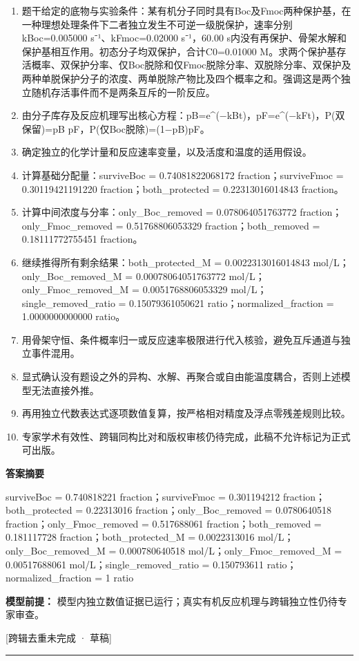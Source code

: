 \documentclass[UTF8,11pt,a4paper]{ctexart}
\begin{document}
\begin{enumerate}
\item 题干给定的底物与实验条件：某有机分子同时具有Boc及Fmoc两种保护基，在一种理想处理条件下二者独立发生不可逆一级脱保护，速率分别kBoc=0.005000 s⁻¹、kFmoc=0.02000 s⁻¹，60.00 s内没有再保护、骨架水解和保护基相互作用。初态分子均双保护，合计C0=0.01000 M。求两个保护基存活概率、双保护分率、仅Boc脱除和仅Fmoc脱除分率、双脱除分率、双保护及两种单脱保护分子的浓度、两单脱除产物比及四个概率之和。强调这是两个独立随机存活事件而不是两条互斥的一阶反应。
\item 由分子库存及反应机理写出核心方程：pB=e\textasciicircum{}(−kBt)，pF=e\textasciicircum{}(−kFt)，P(双保留)=pB pF，P(仅Boc脱除)=(1−pB)pF。
\item 确定独立的化学计量和反应速率变量，以及活度和温度的适用假设。
\item 计算基础分配量：surviveBoc = 0.74081822068172 fraction；surviveFmoc = 0.30119421191220 fraction；both\_protected = 0.22313016014843 fraction。
\item 计算中间浓度与分率：only\_Boc\_removed = 0.078064051763772 fraction；only\_Fmoc\_removed = 0.51768806053329 fraction；both\_removed = 0.18111772755451 fraction。
\item 继续推得所有剩余结果：both\_protected\_M = 0.0022313016014843 mol/L；only\_Boc\_removed\_M = 0.00078064051763772 mol/L；only\_Fmoc\_removed\_M = 0.0051768806053329 mol/L；single\_removed\_ratio = 0.15079361050621 ratio；normalized\_fraction = 1.0000000000000 ratio。
\item 用骨架守恒、条件概率归一或反应速率极限进行代入核验，避免互斥通道与独立事件混用。
\item 显式确认没有题设之外的异构、水解、再聚合或自由能温度耦合，否则上述模型无法直接外推。
\item 再用独立代数表达式逐项数值复算，按严格相对精度及浮点零残差规则比较。
\item 专家学术有效性、跨辑同构比对和版权审核仍待完成，此稿不允许标记为正式可出版。
\end{enumerate}
\noindent\textbf{答案摘要}\par
surviveBoc = 0.740818221 fraction；surviveFmoc = 0.301194212 fraction；both\_protected = 0.22313016 fraction；only\_Boc\_removed = 0.0780640518 fraction；only\_Fmoc\_removed = 0.517688061 fraction；both\_removed = 0.181117728 fraction；both\_protected\_M = 0.0022313016 mol/L；only\_Boc\_removed\_M = 0.000780640518 mol/L；only\_Fmoc\_removed\_M = 0.00517688061 mol/L；single\_removed\_ratio = 0.150793611 ratio；normalized\_fraction = 1 ratio\par
\noindent\textbf{模型前提：}
模型内独立数值证据已运行；真实有机反应机理与跨辑独立性仍待专家审查。\par
\noindent\textcolor{red!65!black}{[跨辑去重未完成 · 草稿]} \par
\medskip\hrule\medskip
{}
\end{document}
